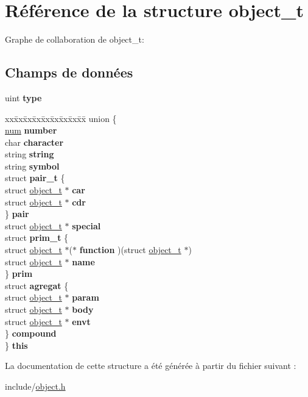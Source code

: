\hypertarget{structobject__t}{}\section{Référence de la structure object\+\_\+t}
\label{structobject__t}


Graphe de collaboration de object\+\_\+t\+:
\subsection*{Champs de données}
\begin{DoxyCompactItemize}
\item 
\hypertarget{structobject__t_a92c5cda86022a69772cb8b6edba7530c}{}\label{structobject__t_a92c5cda86022a69772cb8b6edba7530c} 
uint {\bfseries type}
\item 
\hypertarget{structobject__t_ace8394a5a873527066c787412642bef1}{}\label{structobject__t_ace8394a5a873527066c787412642bef1} 
\begin{tabbing}
xx\=xx\=xx\=xx\=xx\=xx\=xx\=xx\=xx\=\kill
union \{\\
\>\hyperlink{structnum__t}{num} {\bfseries number}\\
\>char {\bfseries character}\\
\>string {\bfseries string}\\
\>string {\bfseries symbol}\\
\>struct {\bfseries pair\_t} \{\\
\>\>struct \hyperlink{structobject__t}{object\_t} $\ast$ {\bfseries car}\\
\>\>struct \hyperlink{structobject__t}{object\_t} $\ast$ {\bfseries cdr}\\
\>\} {\bfseries pair}\\
\>struct \hyperlink{structobject__t}{object\_t} $\ast$ {\bfseries special}\\
\>struct {\bfseries prim\_t} \{\\
\>\>struct \hyperlink{structobject__t}{object\_t} $\ast$($\ast$ {\bfseries function} )(struct \hyperlink{structobject__t}{object\_t} $\ast$)\\
\>\>struct \hyperlink{structobject__t}{object\_t} $\ast$ {\bfseries name}\\
\>\} {\bfseries prim}\\
\>struct {\bfseries agregat} \{\\
\>\>struct \hyperlink{structobject__t}{object\_t} $\ast$ {\bfseries param}\\
\>\>struct \hyperlink{structobject__t}{object\_t} $\ast$ {\bfseries body}\\
\>\>struct \hyperlink{structobject__t}{object\_t} $\ast$ {\bfseries envt}\\
\>\} {\bfseries compound}\\
\} {\bfseries this}\\

\end{tabbing}\end{DoxyCompactItemize}


La documentation de cette structure a été générée à partir du fichier suivant \+:\begin{DoxyCompactItemize}
\item 
include/\hyperlink{object_8h}{object.\+h}\end{DoxyCompactItemize}
